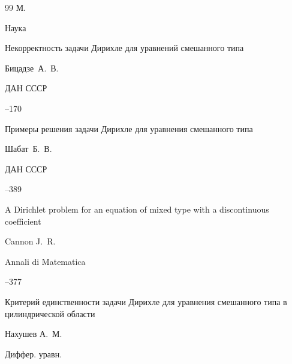 \begin{thebibliography}{99}
\publaddr М.

\publ Наука








\paper Некорректность задачи Дирихле для уравнений смешанного типа

\by Бицадзе~А.~В.

\jour ДАН СССР




--170







\paper Примеры решения задачи Дирихле для уравнения смешанного типа

\by Шабат~Б.~В.

\jour ДАН СССР




--389







\paper A Dirichlet problem for an equation of mixed type with a discontinuous coefficient 

\by Cannon J.~R.

\jour  Annali di Matematica




--377







\paper Критерий единственности задачи Дирихле для уравнения смешанного типа в цилиндрической области

\by  Нахушев А.~М.

\jour Диффер. уравн.


\end{thebibliography}

